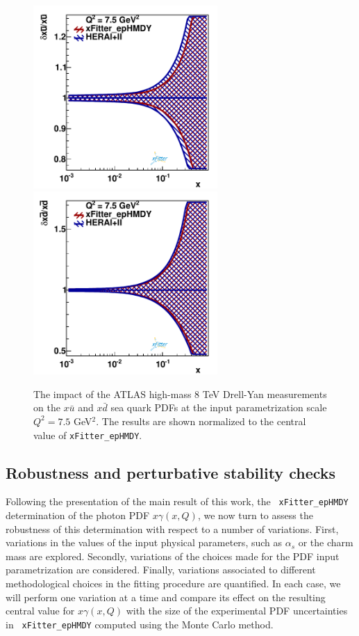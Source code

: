 \begin{figure}[t]
\centering
\includegraphics[width=7cm]{figs/q2_7_5_pdf_ubar_ratio.pdf}
\includegraphics[width=7cm]{figs/q2_7_5_pdf_dbar_ratio.pdf} 
\caption{The impact of the ATLAS high-mass 8 TeV Drell-Yan measurements
  on the $x\bar{u}$ and $x\bar{d}$ sea quark PDFs at the input
  parametrization scale $Q^2=7.5$ GeV$^2$.
  The results are shown normalized to the central value of {\tt xFitter\_epHMDY}. 
  }
\label{fig:QCDfit}
\end{figure}

\subsection{Robustness and perturbative stability checks}
\label{sec:crosschecks}

Following the presentation of the main result of this work, the {\tt
  xFitter\_epHMDY} determination of the
photon PDF $x\gamma(x,Q)$, we now turn to assess the robustness of this determination
with respect to a number of variations.
%
First, variations in the values of the input
physical parameters, such as $\alpha_s$ or the charm mass are explored.
%
Secondly, variations of the choices made for the PDF input parametrization
are considered.
%
Finally,
variations associated to different methodological choices in
the fitting procedure are quantified.
%
In each case, we will perform one variation at a time
and compare its effect on the resulting central value
for $x\gamma(x,Q)$ with the size of the experimental PDF
uncertainties in {\tt
  xFitter\_epHMDY} computed using the Monte Carlo method.

